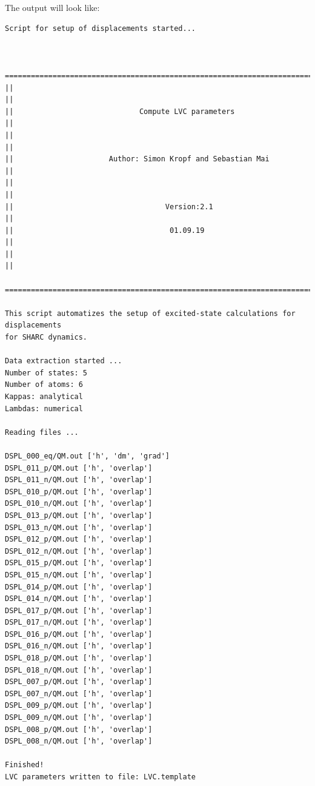 \documentclass[a4paper,11pt,DIV=15,openany]{scrbook}
\begin{document}
The output will look like:
\begin{oframed}
\footnotesize\begin{Verbatim}[commandchars=\\\{\}]
Script for setup of displacements started...


  ================================================================================
||                                                                                ||
||                             Compute LVC parameters                             ||
||                                                                                ||
||                      Author: Simon Kropf and Sebastian Mai                     ||
||                                                                                ||
||                                   Version:2.1                                  ||
||                                    01.09.19                                    ||
||                                                                                ||
  ================================================================================

This script automatizes the setup of excited-state calculations for displacements
for SHARC dynamics.

Data extraction started ...
Number of states: 5
Number of atoms: 6
Kappas: analytical
Lambdas: numerical

Reading files ...

DSPL_000_eq/QM.out ['h', 'dm', 'grad']
DSPL_011_p/QM.out ['h', 'overlap']
DSPL_011_n/QM.out ['h', 'overlap']
DSPL_010_p/QM.out ['h', 'overlap']
DSPL_010_n/QM.out ['h', 'overlap']
DSPL_013_p/QM.out ['h', 'overlap']
DSPL_013_n/QM.out ['h', 'overlap']
DSPL_012_p/QM.out ['h', 'overlap']
DSPL_012_n/QM.out ['h', 'overlap']
DSPL_015_p/QM.out ['h', 'overlap']
DSPL_015_n/QM.out ['h', 'overlap']
DSPL_014_p/QM.out ['h', 'overlap']
DSPL_014_n/QM.out ['h', 'overlap']
DSPL_017_p/QM.out ['h', 'overlap']
DSPL_017_n/QM.out ['h', 'overlap']
DSPL_016_p/QM.out ['h', 'overlap']
DSPL_016_n/QM.out ['h', 'overlap']
DSPL_018_p/QM.out ['h', 'overlap']
DSPL_018_n/QM.out ['h', 'overlap']
DSPL_007_p/QM.out ['h', 'overlap']
DSPL_007_n/QM.out ['h', 'overlap']
DSPL_009_p/QM.out ['h', 'overlap']
DSPL_009_n/QM.out ['h', 'overlap']
DSPL_008_p/QM.out ['h', 'overlap']
DSPL_008_n/QM.out ['h', 'overlap']

Finished!
LVC parameters written to file: LVC.template
\end{Verbatim}
\end{oframed}
\end{document}
